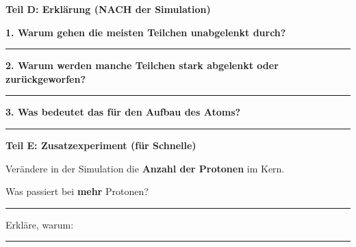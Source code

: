 \documentclass[10pt, a4paper]{article}
\newcommand{\fachfarbe}{physik}
\newcommand{\luecke}[1]{\rule{#1}{0.4pt}}
\newcommand{\abschnitt}[1]{%
    \vspace{8pt}
    \noindent\textbf{\textcolor{\fachfarbe}{#1}}
    \vspace{4pt}
}
\begin{document}
\vspace{8pt}


\abschnitt{Teil D: Erklärung (NACH der Simulation)}

\textbf{1. Warum gehen die meisten Teilchen unabgelenkt durch?}

\vspace{4pt}
\luecke{14cm}

\vspace{8pt}

\textbf{2. Warum werden manche Teilchen stark abgelenkt oder zurückgeworfen?}

\vspace{4pt}
\luecke{14cm}

\vspace{8pt}

\textbf{3. Was bedeutet das für den Aufbau des Atoms?}

\vspace{4pt}
\luecke{14cm}

\vspace{12pt}


\abschnitt{Teil E: Zusatzexperiment (für Schnelle)}

Verändere in der Simulation die \textbf{Anzahl der Protonen} im Kern.

\vspace{6pt}

Was passiert bei \textbf{mehr} Protonen? \luecke{8cm}

\vspace{6pt}

Erkläre, warum: \luecke{10cm}
\end{document}
